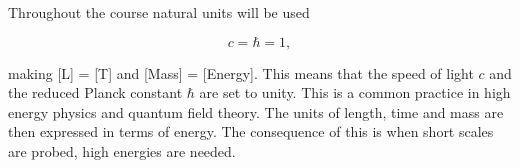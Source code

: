  \label{ch:Introduction}

Throughout the course \textsf{natural units} will be used
\begin{definition}
  \begin{equation}
    c = \hbar = 1,
  \end{equation}
  \vspace{-0.5cm}
\end{definition}
making [L] = [T] and [Mass] = [Energy]. This means that the speed of light $c$ and the reduced Planck constant $\hbar$ are set to unity. This is a common practice in high energy physics and quantum field theory. The units of length, time and mass are then expressed in terms of energy. The consequence of this is when short scales are probed, high energies are needed.


